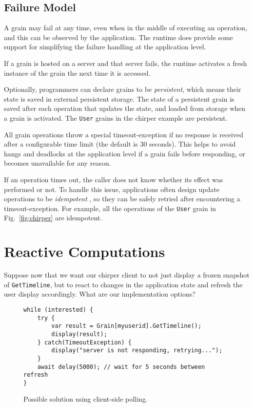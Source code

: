 \subsection{Failure Model}

A grain may fail at any time, even when in the middle of executing an operation, and this can be observed by the application. The runtime does provide some support for simplifying the failure handling at the application level. 

 If a grain is hosted on a server and that server fails, the runtime activates a fresh instance of the grain the next time it is accessed. 

 Optionally, programmers can declare grains to be \emph{persistent}, which means their state is saved in external persistent storage. The state of a persistent grain is saved after each operation that updates the state, and loaded from storage when a grain is activated. The \lstinline|User| grains in the chirper example are persistent. 

 All grain operations throw a special timeout-exception if no response is received after a configurable time limit (the default is 30 seconds). This helps to avoid hangs and deadlocks at the application level if a grain fails before responding, or becomes unavailable for any reason.

If an operation times out, the caller does not know whether its effect was performed or not. To handle this issue, applications often design update operations to be \emph{idempotent} \cite{kapil}, so they can be safely retried after encountering a timeout-exception. For example, all the operations of the \lstinline|User| grain in Fig.~\ref{fig:chirper} are idempotent.

\section{Reactive Computations}\label{sec:formulation}

Suppose now that we want our chirper client to not just display a frozen snapshot of \lstinline|GetTimeline|, but to react to changes in the application state and refresh the user display accordingly. What are our implementation options? 

\begin{figure}
\begin{lstlisting}
while (interested) {
	try {
		var result = Grain[myuserid].GetTimeline();
		display(result);
	} catch(TimeoutException) { 
		display("server is not responding, retrying...");
	}  
	await delay(5000); // wait for 5 seconds between refresh
}
\end{lstlisting}
\caption{Possible solution using client-side polling.}\label{fig:polling}
\end{figure}

